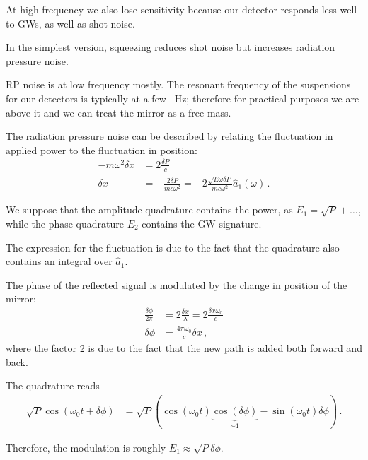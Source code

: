 \documentclass[main.tex]{subfiles}
\begin{document}

At high frequency we also lose sensitivity because our 
detector responds less well to GWs, as well as shot noise. 

In the simplest version, squeezing reduces shot noise but increases
radiation pressure noise. 

RP noise is at low frequency mostly. 
The resonant frequency of the suspensions for our detectors is typically 
at a few \SI{}{Hz}; therefore for practical purposes we are above it and we can treat
the mirror as a free mass. 

The radiation pressure noise can be described by relating the fluctuation in 
applied power to the fluctuation in position:
%
\begin{align}
-m \omega^2 \delta x &= 2 \frac{ \delta P}{c}  \\
\delta x &= - \frac{2 \delta P}{mc \omega^2} = -2 \frac{\sqrt{E \omega \delta P}}{mc \omega^2} \hat{a}_1 (\omega )
\,.
\end{align}

We suppose that the amplitude quadrature contains the power, as \(E_1 = \sqrt{P} + \dots\),
while the phase quadrature \(E_2 \) contains the GW signature. 

The expression for the fluctuation is due to the fact that 
the quadrature also contains an integral over \(\hat{a}_1\). 

The phase of the reflected signal is modulated by the change in position of the mirror: 
%
\begin{align}
\frac{ \delta \phi }{2 \pi } &= 2 \frac{ \delta x}{\lambda } = 2\frac{ \delta x \omega_0 }{c }  \\
\delta \phi &= \frac{4 \pi \omega_0 }{c} \delta x
\,,
\end{align}
%
where the factor 2 is due to the fact that the new path is added both forward and back. 

The quadrature reads 
%
\begin{align}
\sqrt{P}\cos(\omega_0 t + \delta \phi) &= \sqrt{P} \left( \cos( \omega_0 t) \underbrace{\cos(\delta \phi )}_{\sim 1} - \sin( \omega_0 t) \delta \phi \right)
\,.
\end{align}

Therefore, the modulation  is roughly \(E_1 \approx \sqrt{P} \delta \phi \). 
\end{document}
